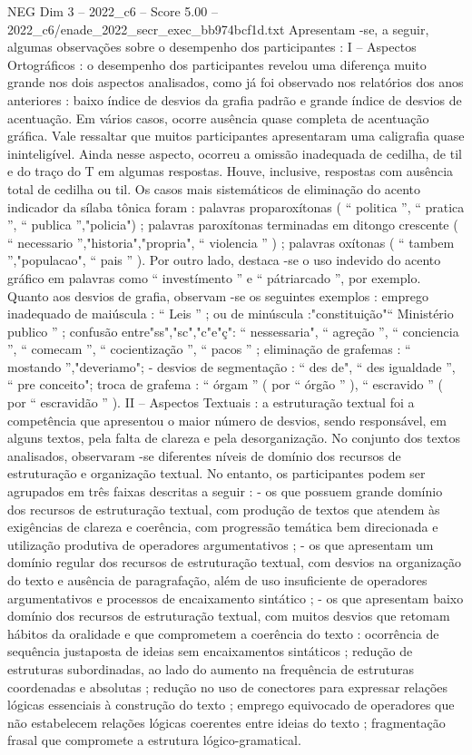 \begin{textsample}{NEG Dim 3 – 2022\_c6 – Score 5.00 – 2022\_c6/enade\_2022\_secr\_exec\_bb974bcf1d.txt}
Apresentam -se, a seguir, algumas observações sobre o desempenho dos participantes : I – Aspectos Ortográficos : o desempenho dos participantes revelou uma diferença muito grande nos dois aspectos analisados, como já foi observado nos relatórios dos anos anteriores : baixo índice de desvios da grafia padrão e grande índice de desvios de acentuação.
Em vários casos, ocorre ausência quase completa de acentuação gráfica.
Vale ressaltar que muitos participantes apresentaram uma caligrafia quase ininteligível.
Ainda nesse aspecto, ocorreu a omissão inadequada de cedilha, de til e do traço do T em algumas respostas.
Houve, inclusive, respostas com ausência total de cedilha ou til.
Os casos mais sistemáticos de eliminação do acento indicador da sílaba tônica foram : palavras proparoxítonas ( “ politica ”, “ pratica ”, “ publica ”,"policia") ; palavras paroxítonas terminadas em ditongo crescente ( “ necessario ”,"historia","propria", “ violencia ” ) ; palavras oxítonas ( “ tambem ”,"populacao", “ pais ” ).
Por outro lado, destaca -se o uso indevido do acento gráfico em palavras como “ investímento ” e “ pátriarcado ”, por exemplo.
Quanto aos desvios de grafia, observam -se os seguintes exemplos : emprego inadequado de maiúscula : “ Leis ” ; ou de minúscula :"constituição"“ Ministério publico ” ; confusão entre"ss","sc","c"e"ç": “ nessessaria", “ agreção ”, “ conciencia ”, “ comecam ”, “ cocientização ”, “ pacos ” ; eliminação de grafemas : “ mostando ”,"deveriamo"; - desvios de segmentação : “ des de", “ des igualdade ”, “ pre conceito"; troca de grafema : “ órgam ” ( por “ órgão ” ), “ escravido ” ( por “ escravidão ” ).
II – Aspectos Textuais : a estruturação textual foi a competência que apresentou o maior número de desvios, sendo responsável, em alguns textos, pela falta de clareza e pela desorganização.
No conjunto dos textos analisados, observaram -se diferentes níveis de domínio dos recursos de estruturação e organização textual.
No entanto, os participantes podem ser agrupados em três faixas descritas a seguir : - os que possuem grande domínio dos recursos de estruturação textual, com produção de textos que atendem às exigências de clareza e coerência, com progressão temática bem direcionada e utilização produtiva de operadores argumentativos ; - os que apresentam um domínio regular dos recursos de estruturação textual, com desvios na organização do texto e ausência de paragrafação, além de uso insuficiente de operadores argumentativos e processos de encaixamento sintático ; - os que apresentam baixo domínio dos recursos de estruturação textual, com muitos desvios que retomam hábitos da oralidade e que comprometem a coerência do texto : ocorrência de sequência justaposta de ideias sem encaixamentos sintáticos ; redução de estruturas subordinadas, ao lado do aumento na frequência de estruturas coordenadas e absolutas ; redução no uso de conectores para expressar relações lógicas essenciais à construção do texto ; emprego equivocado de operadores que não estabelecem relações lógicas coerentes entre ideias do texto ; fragmentação frasal que compromete a estrutura lógico-gramatical.

\end{textsample}
